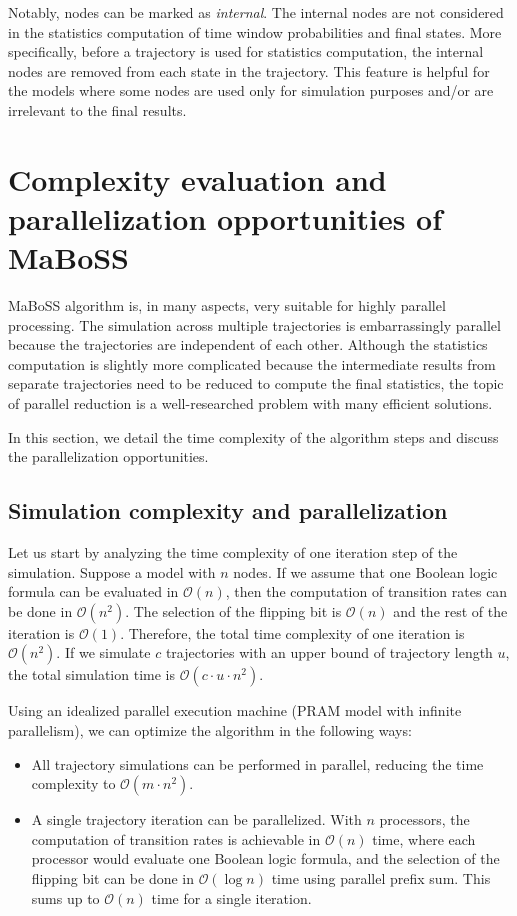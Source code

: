 \documentclass[times, twoside]{zHenriquesLab-StyleBioRxiv}
\begin{document}
Notably, nodes can be marked as \emph{internal}. The internal nodes are not considered in the statistics computation of time window probabilities and final states. More specifically, before a trajectory is used for statistics computation, the internal nodes are removed from each state in the trajectory.
This feature is helpful for the models where some nodes are used only for simulation purposes and/or are irrelevant to the final results.


\section*{Complexity evaluation and parallelization opportunities of MaBoSS}

MaBoSS algorithm is, in many aspects, very suitable for highly parallel processing. The simulation across multiple trajectories is embarrassingly parallel because the trajectories are independent of each other. Although the statistics computation is slightly more complicated because the intermediate results from separate trajectories need to be reduced to compute the final statistics, the topic of parallel reduction is a well-researched problem with many efficient solutions. 

In this section, we detail the time complexity of the algorithm steps and discuss the parallelization opportunities.

\subsection*{Simulation complexity and parallelization}

Let us start by analyzing the time complexity of one iteration step of the simulation. Suppose a model with $n$ nodes. If we assume that one Boolean logic formula can be evaluated in $\mathcal{O}(n)$, then the computation of transition rates can be done in $\mathcal{O}(n^2)$. The selection of the flipping bit is $\mathcal{O}(n)$ and the rest of the iteration is $\mathcal{O}(1)$. Therefore, the total time complexity of one iteration is $\mathcal{O}(n^2)$. If we simulate $c$ trajectories with an upper bound of trajectory length $u$, the total simulation time is $\mathcal{O}(c \cdot u \cdot n^2)$. 

Using an idealized parallel execution machine (PRAM model with infinite parallelism), we can optimize the algorithm in the following ways: 
\begin{itemize}
    \item All trajectory simulations can be performed in parallel, reducing the time complexity to $\mathcal{O}(m \cdot n^2)$.
    \item A single trajectory iteration can be parallelized. With $n$ processors, the computation of transition rates is achievable in $\mathcal{O}(n)$ time, where each processor would evaluate one Boolean logic formula, and the selection of the flipping bit can be done in $\mathcal{O}(\log{n})$ time using parallel prefix sum. This sums up to $\mathcal{O}(n)$ time for a single iteration. 
\end{itemize}
\end{document}
